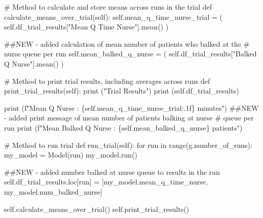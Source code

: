 \documentclass[
  letterpaper,
  DIV=11,
  numbers=noendperiod]{scrreprt}
\newenvironment{Shaded}{}{}
\newcommand{\BuiltInTok}[1]{\textcolor[rgb]{0.84,0.23,0.29}{#1}}
\newcommand{\CommentTok}[1]{\textcolor[rgb]{0.42,0.45,0.49}{#1}}
\newcommand{\ControlFlowTok}[1]{\textcolor[rgb]{0.84,0.23,0.29}{#1}}
\newcommand{\KeywordTok}[1]{\textcolor[rgb]{0.84,0.23,0.29}{#1}}
\newcommand{\NormalTok}[1]{\textcolor[rgb]{0.14,0.16,0.18}{#1}}
\newcommand{\OperatorTok}[1]{\textcolor[rgb]{0.14,0.16,0.18}{#1}}
\newcommand{\SpecialCharTok}[1]{\textcolor[rgb]{0.00,0.36,0.77}{#1}}
\newcommand{\SpecialStringTok}[1]{\textcolor[rgb]{0.01,0.18,0.38}{#1}}
\newcommand{\StringTok}[1]{\textcolor[rgb]{0.01,0.18,0.38}{#1}}
\newcommand{\VariableTok}[1]{\textcolor[rgb]{0.89,0.38,0.04}{#1}}
\begin{document}
\begin{tcolorbox}
\begin{Shaded}
\begin{Highlighting}[]
    \CommentTok{\# Method to calculate and store means across runs in the trial}
    \KeywordTok{def}\NormalTok{ calculate\_means\_over\_trial(}\VariableTok{self}\NormalTok{):}
        \VariableTok{self}\NormalTok{.mean\_q\_time\_nurse\_trial }\OperatorTok{=}\NormalTok{ (}
            \VariableTok{self}\NormalTok{.df\_trial\_results[}\StringTok{"Mean Q Time Nurse"}\NormalTok{].mean()}
\NormalTok{        )}

        \CommentTok{\#\#NEW {-} added calculation of mean number of patients who balked at the}
        \CommentTok{\# nurse queue per run}
        \VariableTok{self}\NormalTok{.mean\_balked\_q\_nurse }\OperatorTok{=}\NormalTok{ (}
            \VariableTok{self}\NormalTok{.df\_trial\_results[}\StringTok{"Balked Q Nurse"}\NormalTok{].mean()}
\NormalTok{        )}

    \CommentTok{\# Method to print trial results, including averages across runs}
    \KeywordTok{def}\NormalTok{ print\_trial\_results(}\VariableTok{self}\NormalTok{):}
        \BuiltInTok{print}\NormalTok{ (}\StringTok{"Trial Results"}\NormalTok{)}
        \BuiltInTok{print}\NormalTok{ (}\VariableTok{self}\NormalTok{.df\_trial\_results)}

        \BuiltInTok{print}\NormalTok{ (}\SpecialStringTok{f"Mean Q Nurse : }\SpecialCharTok{\{}\VariableTok{self}\SpecialCharTok{.}\NormalTok{mean\_q\_time\_nurse\_trial}\SpecialCharTok{:.1f\}}\SpecialStringTok{ minutes"}\NormalTok{)}
        \CommentTok{\#\#NEW {-} added print message of mean number of patients balking at nurse}
        \CommentTok{\# queue per run}
        \BuiltInTok{print}\NormalTok{ (}\SpecialStringTok{f"Mean Balked Q Nurse : }\SpecialCharTok{\{}\VariableTok{self}\SpecialCharTok{.}\NormalTok{mean\_balked\_q\_nurse}\SpecialCharTok{\}}\SpecialStringTok{ patients"}\NormalTok{)}

    \CommentTok{\# Method to run trial}
    \KeywordTok{def}\NormalTok{ run\_trial(}\VariableTok{self}\NormalTok{):}
        \ControlFlowTok{for}\NormalTok{ run }\KeywordTok{in} \BuiltInTok{range}\NormalTok{(g.number\_of\_runs):}
\NormalTok{            my\_model }\OperatorTok{=}\NormalTok{ Model(run)}
\NormalTok{            my\_model.run()}

            \CommentTok{\#\#NEW {-} added number balked at nurse queue to results in the run}
            \VariableTok{self}\NormalTok{.df\_trial\_results.loc[run] }\OperatorTok{=}\NormalTok{ [my\_model.mean\_q\_time\_nurse,}
\NormalTok{                                              my\_model.num\_balked\_nurse]}

        \VariableTok{self}\NormalTok{.calculate\_means\_over\_trial()}
        \VariableTok{self}\NormalTok{.print\_trial\_results()}
\end{Highlighting}
\end{Shaded}

\end{tcolorbox}
\end{document}
